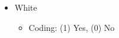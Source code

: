 \documentclass[12pt]{article}
\begin{document}
\begin{appendices}
\begin{refsection}
\begin{itemize}
	\item White 
		\begin{itemize}
			\item Coding: (1) Yes, (0) No
		\end{itemize}
\end{itemize}
%	
%	

\end{refsection}
\end{appendices}
\end{document}
